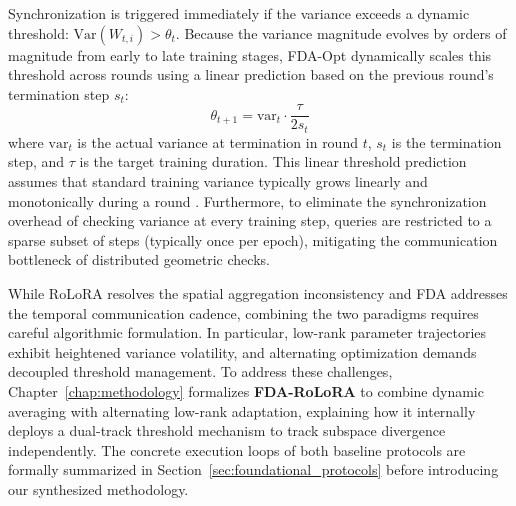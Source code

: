 Synchronization is triggered immediately if the variance exceeds a dynamic threshold: $\text{Var}(W_{t,i}) > \theta_t$. Because the variance magnitude evolves by orders of magnitude from early to late training stages, FDA-Opt dynamically scales this threshold across rounds using a linear prediction based on the previous round's termination step $s_t$:
\begin{equation}
    \theta_{t+1} = \text{var}_t \cdot \frac{\tau}{2 s_t}
    \label{eq:fda_threshold}
\end{equation}
where $\text{var}_t$ is the actual variance at termination in round $t$, $s_t$ is the termination step, and $\tau$ is the target training duration. This linear threshold prediction assumes that standard training variance typically grows linearly and monotonically during a round \cite{theologitis2025fda}. Furthermore, to eliminate the synchronization overhead of checking variance at every training step, queries are restricted to a sparse subset of steps (typically once per epoch), mitigating the communication bottleneck of distributed geometric checks.

While RoLoRA resolves the spatial aggregation inconsistency and FDA addresses the temporal communication cadence, combining the two paradigms requires careful algorithmic formulation. In particular, low-rank parameter trajectories exhibit heightened variance volatility, and alternating optimization demands decoupled threshold management. To address these challenges, Chapter~\ref{chap:methodology} formalizes \textbf{FDA-RoLoRA} to combine dynamic averaging with alternating low-rank adaptation, explaining how it internally deploys a dual-track threshold mechanism to track subspace divergence independently. The concrete execution loops of both baseline protocols are formally summarized in Section~\ref{sec:foundational_protocols} before introducing our synthesized methodology.
